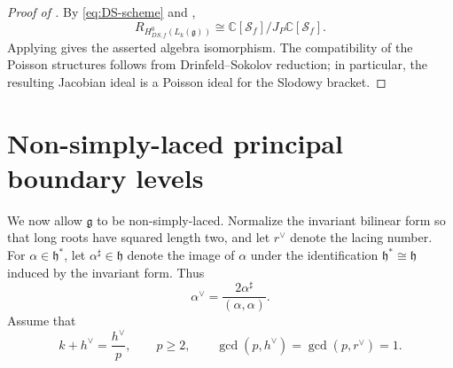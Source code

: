 \documentclass[11pt,reqno]{amsart}
\theoremstyle{remark}
\newcommand{\g}{\mathfrak g}
\newcommand{\h}{\mathfrak h}
\newcommand{\C}{\mathbb C}
\begin{document}
\begin{proof}[Proof of ]
By \eqref{eq:DS-scheme} and ,
\[
R_{H_{DS,f}^0(L_k(\g))}
\cong
\C[\mathcal S_f]/J_P\C[\mathcal S_f].
\]
Applying  gives the asserted algebra isomorphism. The
compatibility of the Poisson structures follows from
Drinfeld--Sokolov reduction; in particular, the resulting Jacobian
ideal is a Poisson ideal for the Slodowy bracket.
\end{proof}

\section{Non-simply-laced principal boundary levels}\label{sec:nonsimply}
We now allow $\g$ to be non-simply-laced. Normalize the invariant
bilinear form so that long roots have squared length two, and let
$r^\vee$ denote the lacing number. For $\alpha\in\h^*$, let
$\alpha^\sharp\in\h$ denote the image of $\alpha$ under the
identification $\h^*\cong\h$ induced by the invariant form. Thus
\[
\alpha^\vee=\frac{2\alpha^\sharp}{(\alpha,\alpha)}.
\]
Assume that
\begin{equation}\label{eq:non-level}
k+h^\vee=\frac{h^\vee}{p},\qquad
p\geq2,\qquad
\gcd(p,h^\vee)=\gcd(p,r^\vee)=1.
\end{equation}
\end{document}
